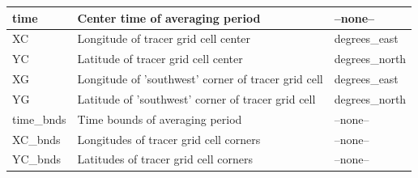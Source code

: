 \begin{longtable}{|m{}|m{}|m{}|}
time &Center time of averaging period &--none--  \\ \hline
XC &Longitude of tracer grid cell center &degrees\_east  \\ \hline
YC &Latitude of tracer grid cell center &degrees\_north  \\ \hline
XG &Longitude of 'southwest' corner of tracer grid cell &degrees\_east  \\ \hline
YG &Latitude of 'southwest' corner of tracer grid cell &degrees\_north  \\ \hline
time\_bnds &Time bounds of averaging period &--none--  \\ \hline
XC\_bnds &Longitudes of tracer grid cell corners &--none--  \\ \hline
YC\_bnds &Latitudes of tracer grid cell corners &--none--  \\ \hline
\end{longtable}

\newp
\pagebreak
